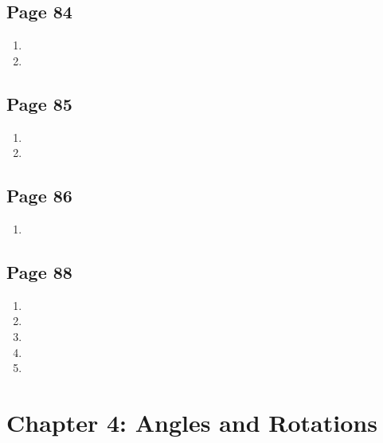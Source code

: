 \documentclass{article}
\newenvironment{solutions}[1]
{\subsection*{#1}
 \begin{enumerate}[leftmargin=1.5em]}
{\end{enumerate}}
\newcommand{\solution}{\item}
\begin{document}
\begin{solutions}{Page 84}
\solution
\solution
\end{solutions}

\begin{solutions}{Page 85}
\solution
\solution
\end{solutions}

\begin{solutions}{Page 86}
\solution
\end{solutions}

\begin{solutions}{Page 88}
\solution
\solution
\solution
\solution
\solution
\end{solutions}

\section*{Chapter 4: Angles and Rotations}
\end{document}
